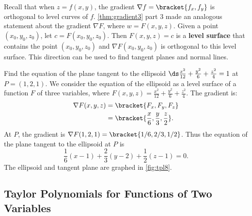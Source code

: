 Recall that when $z=f(x,y)$, the gradient $\nabla f =\bracket{f_x,f_y}$ is orthogonal to level curves of $f$. \autoref{thm:gradient3} part 3 made an analogous statement about the gradient $\nabla F$, where $w= F(x,y,z)$. Given a point $(x_0,y_0,z_0)$, let $c = F(x_0,y_0,z_0)$. Then $F(x,y,z) = c$ is a \textbf{level surface} that contains the point $(x_0,y_0,z_0)$ and %
$\nabla F(x_0,y_0,z_0)$ is orthogonal to this level surface.
%
%
%
This direction can be used to find tangent planes and normal lines.

\begin{example}\label{ex_tpl8}
Find the equation of the plane tangent to the ellipsoid $\ds \frac{x^2}{12} +\frac{y^2}{6}+\frac{z^2}{4}=1$ at $P = (1,2,1)$.
\solution
We consider the equation of the ellipsoid as a level surface of a function $F$ of three variables, where $F(x,y,z) = \frac{x^2}{12} +\frac{y^2}{6}+\frac{z^2}{4}$.  The gradient is:
%
%
\begin{align*}
\nabla F(x,y,z) &=\bracket{F_x, F_y,F_z}\\
			&=\bracket{\frac x6, \frac y3, \frac z2}.
\end{align*}
At  $P$, the gradient is $\nabla F(1,2,1) =\bracket{1/6, 2/3, 1/2}$. Thus the equation of the plane tangent to the ellipsoid at $P$ is
\[\frac 16(x-1) + \frac23(y-2) + \frac 12(z-1) = 0.\]
The ellipsoid and tangent plane are graphed in \autoref{fig:tpl8}.
\end{example}

\subsection*{Taylor Polynomials for Functions of Two Variables}

